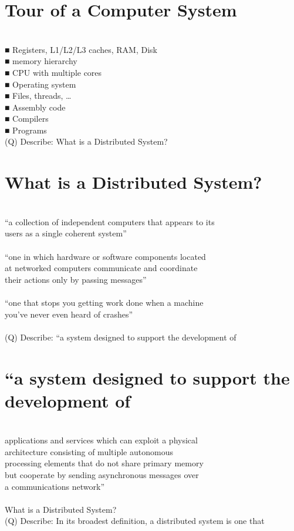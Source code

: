 \documentclass[12pt]{article}
\begin{document}
\section{Tour of a Computer System}
\\
■ Registers, L1/L2/L3 caches, RAM, Disk\\
■ memory hierarchy\\
■ CPU with multiple cores\\
■ Operating system\\
■ Files, threads, …\\
■ Assembly code\\
■ Compilers\\
■ Programs\\
\clearpage
(Q)
Describe: What is a Distributed System?
\clearpage
\section{What is a Distributed System?}
\\
“a collection of independent computers that appears to its \\
users as a single coherent system”\\
[Tanenbaum and van Steen]\\
“one in which hardware or software components located \\
at networked computers communicate and coordinate \\
their actions only by passing messages”\\
[Coulouris, Dollimore, Kindberg]\\
“one that stops you getting work done when a machine \\
you’ve never even heard of crashes”\\
[Lamport]\\
\clearpage
(Q)
Describe: “a system designed to support the development of 
\clearpage
\section{“a system designed to support the development of }
\\
applications and services which can exploit a physical \\
architecture consisting of multiple autonomous \\
processing elements that do not share primary memory \\
but cooperate by sending asynchronous messages over \\
a communications network”\\
[Blair and Stefani, 1998]\\
What is a Distributed System?\\
\clearpage
(Q)
Describe: In its broadest definition, a distributed system is one that 
\clearpage
\end{document}
